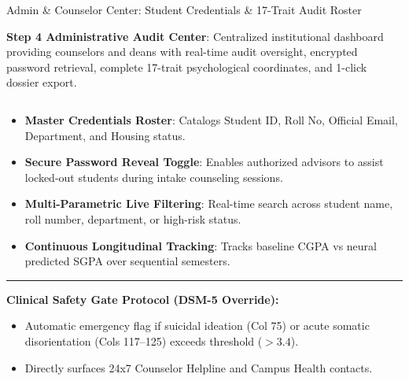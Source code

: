 \documentclass{beamer}
\begin{document}
\begin{frame}[t]{Admin \& Counselor Center: Student Credentials \& 17-Trait Audit Roster}
  \vspace{-0.25cm}
  \begin{topsummarybar}
    \fontsize{5.8pt}{7.0pt}\selectfont
    \textbf{\color{NavyDark}Step 4 Administrative Audit Center}: Centralized institutional dashboard providing counselors and deans with real-time audit oversight, encrypted password retrieval, complete 17-trait psychological coordinates, and 1-click dossier export.
  \end{topsummarybar}
  \vspace{-0.2cm}

  \begin{columns}[T]
    \begin{column}{0.54\textwidth}
      \begin{tcolorbox}[colback=white, colframe=BlueDeep, arc=1.2mm, boxrule=0.8pt, top=0.5mm, bottom=0.5mm, left=0.8mm, right=0.8mm, title={\scriptsize\bfseries\color{white}Live Student Registry \& Security Management}, colbacktitle=BlueDeep]
        \fontsize{4.6pt}{5.6pt}\selectfont
        \begin{itemize}\setlength{\itemsep}{2pt}
          \item \textbf{Master Credentials Roster}: Catalogs Student ID, Roll No, Official Email, Department, and Housing status.
          \item \textbf{Secure Password Reveal Toggle}: Enables authorized advisors to assist locked-out students during intake counseling sessions.
          \item \textbf{Multi-Parametric Live Filtering}: Real-time search across student name, roll number, department, or high-risk status.
          \item \textbf{Continuous Longitudinal Tracking}: Tracks baseline CGPA vs neural predicted SGPA over sequential semesters.
        \end{itemize}
        \vspace{1mm}
        \hrule
        \vspace{1mm}
        \textbf{Clinical Safety Gate Protocol (DSM-5 Override):}
        \begin{itemize}\setlength{\itemsep}{1pt}
          \item Automatic emergency flag if suicidal ideation (Col 75) or acute somatic disorientation (Cols 117--125) exceeds threshold ($>3.4$).
          \item Directly surfaces 24x7 Counselor Helpline and Campus Health contacts.
        \end{itemize}
      \end{tcolorbox}
    \end{column}


\end{columns}
\end{frame}
\end{document}
